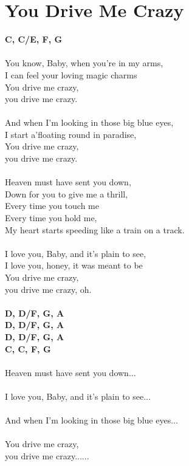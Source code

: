 \section{You Drive Me Crazy}
\footnotesize\textbf{C, C/E, F, G}\\
\\
\normalsize
{}You know, Baby, when you're in my arms,\\
I can feel your loving magic charms\\
You drive me crazy,\\
you drive me crazy.\\
\\
And when I'm looking in those big blue eyes,\\
I start a'floating round in paradise,\\
You drive me crazy,\\
you drive me crazy.\\
\\
Heaven must have sent you down,\\
Down for you to give me a thrill,\\
Every time you touch me\\
Every time you hold me,\\
My heart starts speeding like a train on a track.\\
\\
I love you, Baby, and it's plain to see,\\
I love you, honey, it was meant to be\\
You drive me crazy,\\
you drive me crazy, oh.\\
\\
\footnotesize\textbf{D, D/F\kr , G, A\\
D, D/F\kr , G, A\\
D, D/F\kr , G, A\\
C, C, F, G}\\
\normalsize
\\
Heaven must have sent you down...\\
\\
I love you, Baby, and it's plain to see...\\
\\
And when I'm looking in those big blue eyes...\\
\\
You drive me crazy,\\
you drive me crazy......\\